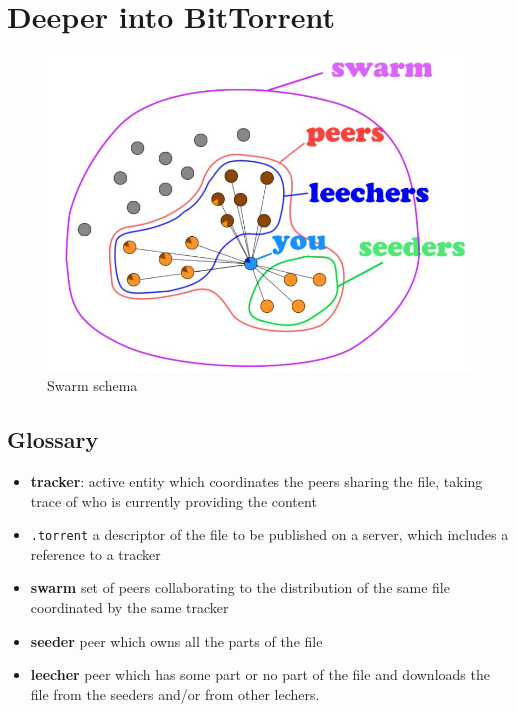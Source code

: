 \section{Deeper into BitTorrent}
\begin{figure}[htbp]
   \centering
   \includegraphics{images/bit_swarmschema.png}
   \caption{Swarm schema}
   \label{fig:bit_swarmschema}
\end{figure}
\subsection{Glossary}
\begin{itemize}
   \item \textbf{tracker}: active entity which coordinates
   the peers sharing the file, taking trace of who is currently providing the content
   \item \texttt{.torrent} a descriptor of the file to be published on a server, which includes a reference to a tracker
   \item \textbf{swarm} set of peers collaborating to the distribution of the same file coordinated by the same tracker
   \item \textbf{seeder} peer which owns all the parts of the file
   \item \textbf{leecher} peer which has some part or no part of the file and downloads the file from the seeders and/or from other lechers.
\end{itemize}

